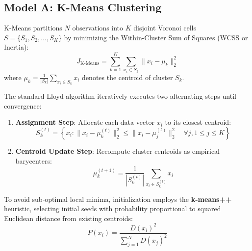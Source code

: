 \documentclass[12pt,a4paper]{article}
\begin{document}
\subsection{Model A: K-Means Clustering}
K-Means partitions $N$ observations into $K$ disjoint Voronoi cells $S = \{S_1, S_2, \dots, S_K\}$ by minimizing the Within-Cluster Sum of Squares (WCSS or Inertia):
\begin{equation}
J_{\text{K-Means}} = \sum_{k=1}^K \sum_{x_i \in S_k} \| x_i - \mu_k \|_2^2
\end{equation}
where $\mu_k = \frac{1}{|S_k|} \sum_{x_i \in S_k} x_i$ denotes the centroid of cluster $S_k$.

The standard Lloyd algorithm iteratively executes two alternating steps until convergence:
\begin{enumerate}
\item \textbf{Assignment Step}: Allocate each data vector $x_i$ to its closest centroid:
\begin{equation}
S_k^{(t)} = \left\{ x_i : \| x_i - \mu_k^{(t)} \|_2^2 \le \| x_i - \mu_j^{(t)} \|_2^2 \quad \forall j, 1 \le j \le K \right\}
\end{equation}
\item \textbf{Centroid Update Step}: Recompute cluster centroids as empirical barycenters:
\begin{equation}
\mu_k^{(t+1)} = \frac{1}{|S_k^{(t)}|} \sum_{x_i \in S_k^{(t)}} x_i
\end{equation}
\end{enumerate}

To avoid sub-optimal local minima, initialization employs the \textbf{k-means++} heuristic, selecting initial seeds with probability proportional to squared Euclidean distance from existing centroids:
\begin{equation}
P(x_i) = \frac{D(x_i)^2}{\sum_{j=1}^N D(x_j)^2}
\end{equation}
\end{document}

